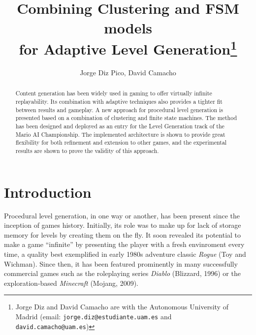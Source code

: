 \documentclass[conference]{IEEEtran}
\begin{document}
\title{\ \\ \LARGE\bf Combining Clustering and FSM models \\ for Adaptive Level Generation\thanks{Jorge Diz and David Camacho are with the Autonomous University of Madrid (email: {\tt jorge.diz@estudiante.uam.es} and {\tt david.camacho@uam.es})}}

\author{Jorge Diz Pico, David Camacho}


\maketitle

\begin{abstract}
Content generation has been widely used in gaming
to offer virtually infinite replayability.
Its combination with adaptive techniques also provides a tighter fit between
results and gameplay.
A new approach for procedural level generation
is presented based on a combination of clustering and finite state machines.
The method has been designed and deployed as an entry for the 
Level Generation track of the Mario AI Championship.
The implemented architecture is shown to provide
great flexibility for both refinement and
extension to other games, and the
experimental results are shown to prove
the validity of this approach. 

\end{abstract}


\section{Introduction}
Procedural level generation, in one way or another, has been present since the inception of games history. Initially, its role was to make up for lack of storage memory for levels by creating them on the fly. It soon revealed its potential to make a game ``infinite'' by presenting the player with a fresh envinroment every time, a quality best exemplified in early 1980s adventure classic \textit{Rogue} (Toy and Wichman). Since then, it has been featured prominently in many successfully commercial games such as the roleplaying series \textit{Diablo} (Blizzard, 1996) or the exploration-based \textit{Minecraft} (Mojang, 2009).
\end{document}
